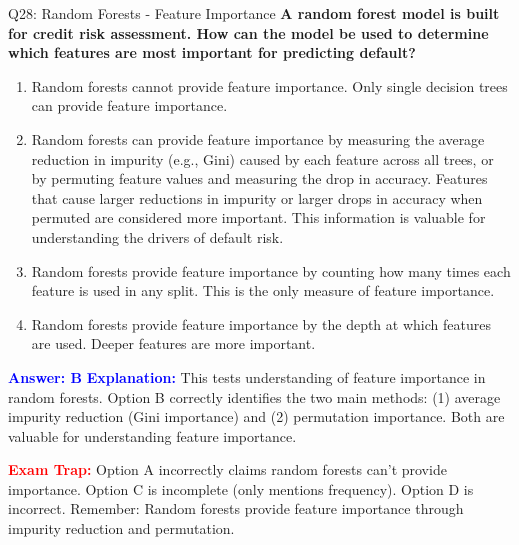 \documentclass[8pt]{beamer}
\begin{document}
	\begin{frame}{Q28: Random Forests - Feature Importance}
		\fontsize{6.5}{7.5}\selectfont
		\textbf{A random forest model is built for credit risk assessment. How can the model be used to determine which features are most important for predicting default?}
		
		\begin{enumerate}
			\item Random forests cannot provide feature importance. Only single decision trees can provide feature importance.
			\item Random forests can provide feature importance by measuring the average reduction in impurity (e.g., Gini) caused by each feature across all trees, or by permuting feature values and measuring the drop in accuracy. Features that cause larger reductions in impurity or larger drops in accuracy when permuted are considered more important. This information is valuable for understanding the drivers of default risk.
			\item Random forests provide feature importance by counting how many times each feature is used in any split. This is the only measure of feature importance.
			\item Random forests provide feature importance by the depth at which features are used. Deeper features are more important.
		\end{enumerate}
		
		\vspace{0.1cm}
		\textcolor{blue}{\textbf{Answer: B}}
		\vspace{0.1cm}
		\textcolor{blue}{\textbf{Explanation:}} This tests understanding of feature importance in random forests. Option B correctly identifies the two main methods: (1) average impurity reduction (Gini importance) and (2) permutation importance. Both are valuable for understanding feature importance.
		
		\textcolor{red}{\textbf{Exam Trap:}} Option A incorrectly claims random forests can't provide importance. Option C is incomplete (only mentions frequency). Option D is incorrect. Remember: Random forests provide feature importance through impurity reduction and permutation.
	\end{frame}
	
\end{document}

